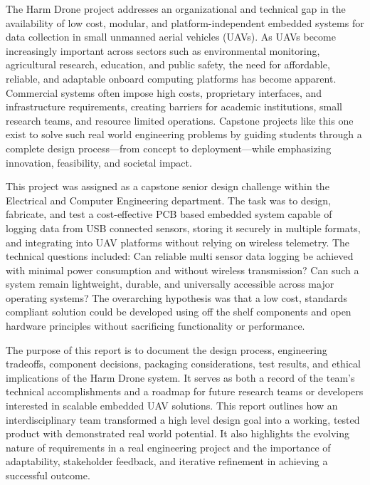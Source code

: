 \documentclass[12pt]{article}
\begin{document}
\par The Harm Drone project addresses an organizational and technical gap in the availability of low cost, modular, and platform-independent embedded systems for data collection in small unmanned aerial vehicles (UAVs). As UAVs become increasingly important across sectors such as environmental monitoring, agricultural research, education, and public safety, the need for affordable, reliable, and adaptable onboard computing platforms has become apparent. Commercial systems often impose high costs, proprietary interfaces, and infrastructure requirements, creating barriers for academic institutions, small research teams, and resource limited operations. Capstone projects like this one exist to solve such real world engineering problems by guiding students through a complete design process—from concept to deployment—while emphasizing innovation, feasibility, and societal impact.

\par This project was assigned as a capstone senior design challenge within the Electrical and Computer Engineering department. The task was to design, fabricate, and test a cost-effective PCB based embedded system capable of logging data from USB connected sensors, storing it securely in multiple formats, and integrating into UAV platforms without relying on wireless telemetry. The technical questions included: Can reliable multi sensor data logging be achieved with minimal power consumption and without wireless transmission? Can such a system remain lightweight, durable, and universally accessible across major operating systems? The overarching hypothesis was that a low cost, standards compliant solution could be developed using off the shelf components and open hardware principles without sacrificing functionality or performance.

\par The purpose of this report is to document the design process, engineering tradeoffs, component decisions, packaging considerations, test results, and ethical implications of the Harm Drone system. It serves as both a record of the team’s technical accomplishments and a roadmap for future research teams or developers interested in scalable embedded UAV solutions. This report outlines how an interdisciplinary team transformed a high level design goal into a working, tested product with demonstrated real world potential. It also highlights the evolving nature of requirements in a real engineering project and the importance of adaptability, stakeholder feedback, and iterative refinement in achieving a successful outcome.
\end{document}
